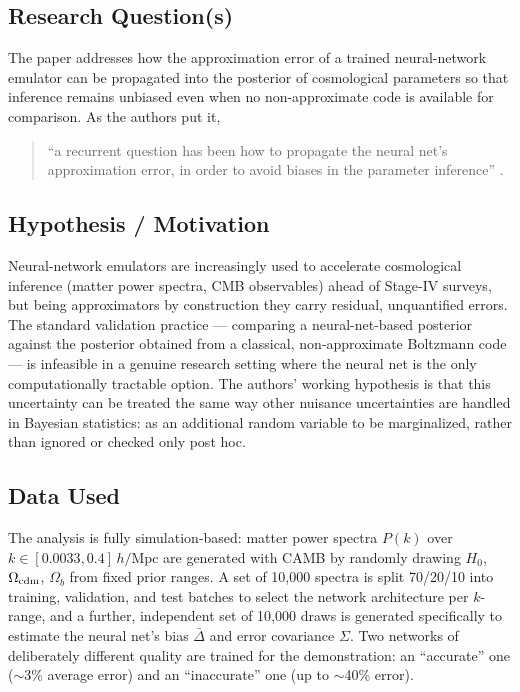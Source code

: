 \documentclass[11pt]{article}
\begin{document}
\subsection{Research Question(s)}
The paper addresses how the approximation error of a trained neural-network emulator can be propagated into the posterior of cosmological parameters so that inference remains unbiased even when no non-approximate code is available for comparison. As the authors put it,

\begin{quote}
\enquote{a recurrent question has been how to propagate the neural net's approximation error, in order to avoid biases in the parameter inference} \citep[p.~1]{grandon2022bayesian}.
\end{quote}

\subsection{Hypothesis / Motivation}
Neural-network emulators are increasingly used to accelerate cosmological inference (matter power spectra, CMB observables) ahead of Stage-IV surveys, but being approximators by construction they carry residual, unquantified errors. The standard validation practice — comparing a neural-net-based posterior against the posterior obtained from a classical, non-approximate Boltzmann code — is infeasible in a genuine research setting where the neural net is the only computationally tractable option. The authors' working hypothesis is that this uncertainty can be treated the same way other nuisance uncertainties are handled in Bayesian statistics: as an additional random variable to be marginalized, rather than ignored or checked only post hoc.

\subsection{Data Used}
The analysis is fully simulation-based: matter power spectra $P(k)$ over $k\in[0.0033,0.4]\,h/\mathrm{Mpc}$ are generated with CAMB by randomly drawing $H_0$, $\Omega_{\rm cdm}$, $\Omega_b$ from fixed prior ranges. A set of 10{,}000 spectra is split 70/20/10 into training, validation, and test batches to select the network architecture per $k$-range, and a further, independent set of 10{,}000 draws is generated specifically to estimate the neural net's bias $\bar{\Delta}$ and error covariance $\Sigma$. Two networks of deliberately different quality are trained for the demonstration: an ``accurate'' one ($\sim$3\% average error) and an ``inaccurate'' one (up to $\sim$40\% error).
\end{document}
